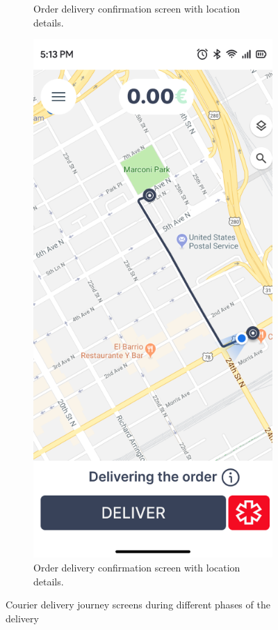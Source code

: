 \documentclass[a4paper,twoside,11pt]{article}
\begin{document}
\begin{figure}[h]
\begin{subfigure}[b]{0.48\textwidth}
        \caption{Order delivery confirmation screen with location details.}
        \label{fig:pickup_order}
    \end{subfigure}
    \hfill
    \begin{subfigure}[b]{0.48\textwidth}
        \centering
        \includegraphics[width=\textwidth]{deliver_order_screen.png}
        \caption{Order delivery confirmation screen with location details.}
        \label{fig:deliver_order}
    \end{subfigure}
    \caption{Courier delivery journey screens during different phases of the delivery}
    \label{fig:courier_status}
\end{figure}

\newpage
\end{document}
